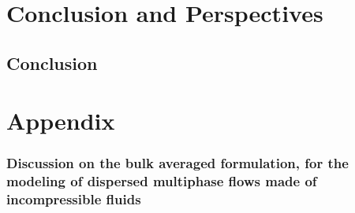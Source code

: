 \documentclass[
    a4paper,                            %
    12pt,                               %
    twoside,                            %
    open=right,                         %
]{My_book}
\begin{document}


\part*{Conclusion and Perspectives}


\chapter*{Conclusion}




\appendix
\renewcommand{\thesection}{\Alph{section}}
\renewcommand{\thesubsection}{\Alph{section}.\arabic{subsection}}
\part*{Appendix}








% 
% 
% 
% 
% 
% 
















\section{
Discussion on the bulk averaged formulation, for the modeling of dispersed multiphase flows made of incompressible fluids
}
\label{ap:momentum_formulation}




\end{document}
